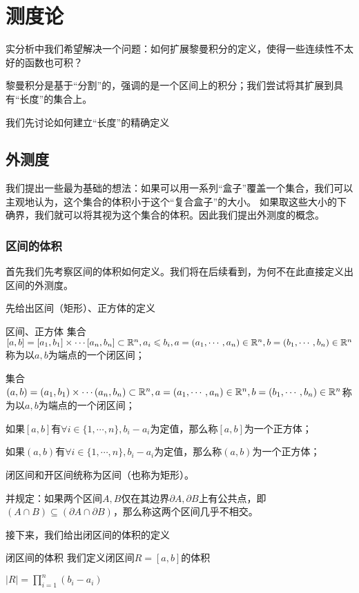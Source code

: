 \documentclass[12pt, a4paper, oneside, UTF8]{ctexbook}
\begin{document}
% 
\else
\fi
\chapter{测度论}
	实分析中我们希望解决一个问题：如何扩展黎曼积分的定义，使得一些连续性不太好的函数也可积？
	
	黎曼积分是基于“分割”的，强调的是一个区间上的积分；我们尝试将其扩展到具有“长度”的集合上。
	
	我们先讨论如何建立“长度”的精确定义
	\section{外测度}
	我们提出一些最为基础的想法：如果可以用一系列“盒子”覆盖一个集合，我们可以主观地认为，这个集合的体积小于这个“复合盒子”的大小。
	如果取这些大小的下确界，我们就可以将其视为这个集合的体积。因此我们提出外测度的概念。
		\subsection{区间的体积}
			首先我们先考察区间的体积如何定义。我们将在后续看到，为何不在此直接定义出区间的外测度。
			
			先给出区间（矩形）、正方体的定义
			\begin{defn}{区间、正方体}{}
				集合$[a,b]=[a_1,b_1] \times \cdots [a_n,b_n] \subset \mathbb{R}^n,a_i \leqslant b_i,a=(a_1,\cdots,a_n)\in\mathbb{R}^n,b=(b_1,\cdots,b_n)\in\mathbb{R}^n$称为以$a,b$为端点的一个闭区间；
				
				集合$(a,b)=(a_1,b_1) \times \cdots (a_n,b_n) \subset \mathbb{R}^n,a=(a_1,\cdots,a_n)\in\mathbb{R}^n,b=(b_1,\cdots,b_n)\in\mathbb{R}^n$称为以$a,b$为端点的一个闭区间；
				
				如果$[a,b]$有$\forall i \in \{1,\cdots,n\},b_i-a_i$为定值，那么称$[a,b]$为一个正方体；
				
				如果$(a,b)$有$\forall i \in \{1,\cdots,n\},b_i-a_i$为定值，那么称$(a,b)$为一个正方体；
				
				闭区间和开区间统称为区间（也称为矩形）。
				
				并规定：如果两个区间$A,B$仅在其边界$\partial A,\partial B$上有公共点，即$(A \cap B )\subseteq (\partial A \cap \partial B)$，那么称这两个区间几乎不相交。
			\end{defn}
			接下来，我们给出闭区间的体积的定义
			\begin{defn}{闭区间的体积}
				我们定义闭区间$R = [a,b]$的体积
				
				$|R| = \prod\limits_{i=1}^{n} (b_i-a_i)$
			\end{defn}
\end{document}
